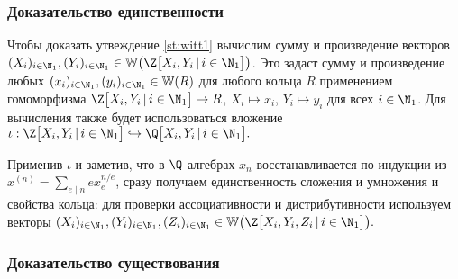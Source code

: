 \documentclass[
	extrafontsizes,
	11pt,
	hyphens,
]{memoir}
\begin{document}
\subsubsection{Доказательство единственности}

Чтобы доказать утвеждение \ref{st:witt1} 
вычислим сумму и произведение
векторов
\(
(X_i)_{i \in \N_1},
(Y_i)_{i \in \N_1}
\in
\mathbb{W}\bigl(\Z\bigl[ X_i, Y_i \,|\, i \in \N_1 \bigr]\bigr)
\).
Это задаст сумму и произведение любых
\((x_i)_{i \in \N_1},(y_i)_{i \in \N_1} \in \mathbb{W}(R)\)
для любого
кольца
\(R\)
применением гомоморфизма
\(
\Z\bigl[X_i, Y_i \,|\, i \in \N_1 \bigr]
\to R
\),
\(X_i \mapsto x_i\),
\(Y_i \mapsto y_i\) 
для всех
\(i \in \N_1\).
Для вычисления
также будет использоваться вложение
\(\iota :
\Z\bigl[X_i, Y_i \,|\, i \in \N_1 \bigr]
\hookrightarrow
\Q\bigl[X_i, Y_i \,|\, i \in \N_1 \bigr].
\)

Применив \(\iota\)
и заметив, что в \(\Q\)-ал\-ге\-брах \(x_n\) восстанавливается по индукции из
\(
x^{(n)} = \sum_{e \mid n} e x_e^{n/e}
\),
сразу
получаем единственность сложения и умножения и свойства кольца: для проверки ассоциативности и дистрибутивности
используем
векторы
\(
(X_i)_{i \in \N_1},
(Y_i)_{i \in \N_1},
(Z_i)_{i \in \N_1}
\in
\mathbb{W}\bigl(\Z\bigl[ X_i, Y_i, Z_i \,|\, i \in \N_1 \bigr]\bigr).
\)

\subsubsection{Доказательство существования}
\end{document}
